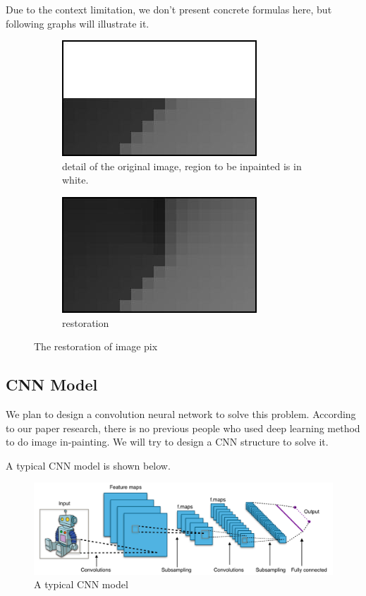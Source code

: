 \documentclass[12pt]{article}
\begin{document}
\qquad Due to the context limitation, we don't present concrete formulas here, but following graphs will illustrate it.
\begin{figure}[H]
	\begin{subfigure}[pos]{.5\textwidth}
		\centering
		\includegraphics*[width=0.8\linewidth]{5.jpg}
		\caption{detail of the original image, region to be inpainted is in white.}
	\end{subfigure}%
	\begin{subfigure}[pos]{.5\textwidth}
		\centering
		\includegraphics*[width=0.8\linewidth]{4.jpg}
		\caption{restoration}
	\end{subfigure}%
	\caption{The restoration of image pix}
\end{figure}
 
\subsection{CNN Model}
\qquad We plan to design a convolution neural network to solve this problem. According to our paper research, there is no previous people who used deep learning method to do image in-painting. We will try to design a CNN structure to solve it.

\qquad A typical CNN model is shown below. 
\begin{figure}[H]
	\centering
	\includegraphics[width=0.8\linewidth]{6.png}
	\caption{A typical CNN model}
\end{figure}
\end{document}
